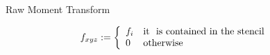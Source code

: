 \begin{frame}{Raw Moment Transform}
\centering
\begin{center}
\begin{align*}
  f_{xyz} &:= \left\{ 
  \begin{array}{l l}
  f_i & \text{it } \text{ is contained in the stencil} \\
  0 & \text{otherwise}
  \end{array}
  \right. 
\end{align*}
\end{center}
\end{frame}

